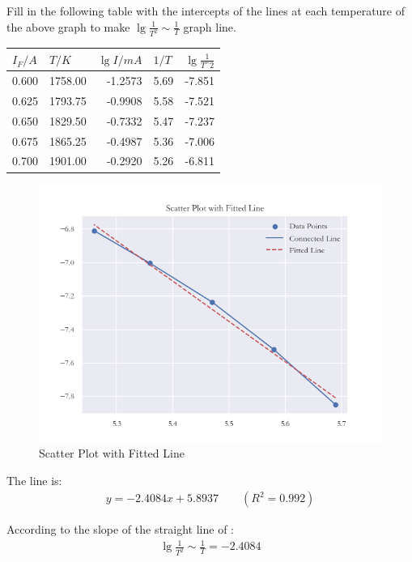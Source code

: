 \documentclass[UTF8]{article}
\begin{document}
Fill in the following table with the intercepts of the lines at each temperature of the above graph to make  $\lg{\frac{1}{T^2}\sim \frac{1}{T} } $  graph line.
\begin{table}[htbp]
  \centering
    \begin{tabular}{rrrrr}
    \toprule[2pt]
    \multicolumn{1}{l}{$I_F/A$} & \multicolumn{1}{l}{$T/K$} & \multicolumn{1}{l}{$\lg I /mA$} & \multicolumn{1}{l}{$1/T$} & \multicolumn{1}{l}{$\lg \frac {1}{T\^2}$} \\
    \midrule
    0.600   & 1758.00  & -1.2573 & 5.69  & -7.851 \\
    0.625 & 1793.75 & -0.9908 & 5.58  & -7.521 \\
    0.650  & 1829.50 & -0.7332 & 5.47  & -7.237 \\
    0.675 & 1865.25 & -0.4987 & 5.36  & -7.006 \\
    0.700   & 1901.00  & -0.2920 & 5.26  & -6.811 \\
    \bottomrule[2pt]
    \end{tabular}%
  \label{tab:addlabel}%
\end{table}%
\begin{figure}[H]
            	\centering
            	\includegraphics[clip,scale=1,trim={0 0 0 0}]{fig/fig15.png}
            	\caption{Scatter Plot with Fitted Line}
            	\label{figure.15}
\end{figure}
The line is:
\begin{eqnarray}
y = -2.4084x + 5.8937 \qquad (R^2=0.992)
\end{eqnarray}

According to the slope of the straight line of :
\begin{eqnarray}
\lg{\frac{1}{T^2} } \sim \frac{1}{T} = -2.4084
\end{eqnarray}
\end{document}
